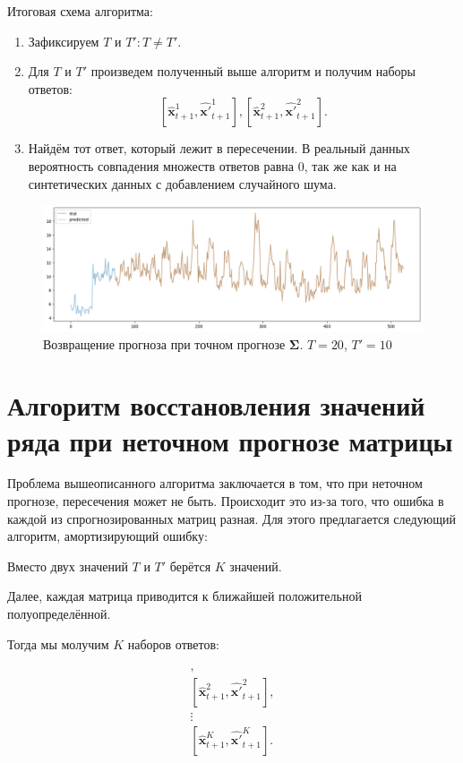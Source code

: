 \documentclass{article}
\begin{document}
Итоговая схема алгоритма:

\begin{enumerate}
	\item Зафиксируем $T$ и $T': T \neq T'$.
	\item Для $T$ и $T'$ произведем полученный выше алгоритм и получим наборы ответов: \[ [\hat{\mathbf{x}}_{t+1}^1, \hat{\mathbf{x}'}_{t+1}^1], [\hat{\mathbf{x}}_{t+1}^2, \hat{\mathbf{x}'}_{t+1}^2].\]
	\item Найдём тот ответ, который лежит в пересечении.
	В реальный данных вероятность совпадения множеств ответов равна 0, так же как и на синтетических данных с добавлением случайного шума.
\end{enumerate}


\begin{figure}[H]
	\centering
	\includegraphics[width=\textwidth]{TwoTAlgo.png}
	\caption{Возвращение прогноза при точном прогнозе $\mathbf{\Sigma}$. $T=20$, $T'=10$}
	\label{fig:fig3}
\end{figure}

\section{Алгоритм восстановления значений ряда при неточном прогнозе матрицы}

Проблема вышеописанного алгоритма заключается в том, что при неточном прогнозе, пересечения может не быть. Происходит это из-за того, что ошибка в каждой из спрогнозированных матриц разная. Для этого предлагается следующий алгоритм, амортизирующий ошибку:

Вместо двух значений  $T$ и $T'$ берётся $K$ значений.

Далее, каждая матрица приводится к ближайшей положительной полуопределённой.

Тогда мы молучим $K$ наборов ответов:

\begin{gather*}
	[\hat{\mathbf{x}}_{t+1}^1, \hat{\mathbf{x}'}_{t+1}^1],\\
	[\hat{\mathbf{x}}_{t+1}^2, \hat{\mathbf{x}'}_{t+1}^2],\\
	\vdots \\
	[\hat{\mathbf{x}}_{t+1}^K, \hat{\mathbf{x}'}_{t+1}^K].
\end{gather*}
\end{document}
